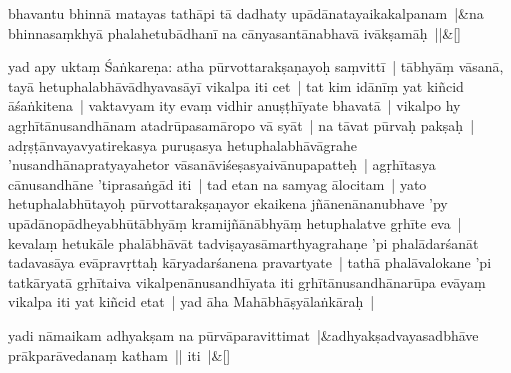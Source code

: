 \documentclass[article,12pt,a4paper]{memoir}%
\newcommand{\persName}[1]{#1}
\newcounter{parCount}
\begin{document}
	{}
	\pend%
      
	    
	    \stanza[\smallbreak]
	  bhavantu bhinnā matayas tathāpi tā dadhaty upādānatayaikakalpanam |&na bhinnasaṃkhyā phalahetubādhanī na cānyasantānabhavā ivākṣamāḥ ||\&[\smallbreak]
	  
	  
	  

	  
	  \pstart \leavevmode%
	\label{thakur75-126.29}yad apy uktaṃ \persName{Śaṅkareṇa}: atha pūrvottarakṣaṇayoḥ saṃvittī | tābhyāṃ vāsanā, tayā hetuphalabhāvādhyavasāyī vikalpa iti cet | \label{thakur75-126.30} tat kim idānīṃ yat kiñcid āśaṅkitena | vaktavyam ity evaṃ vidhir anuṣṭhīyate bhavatā | vikalpo hy agṛhītānusandhānam atadrūpasamāropo vā syāt | \label{thakur75-126.32} na tāvat pūrvaḥ pakṣaḥ | adṛṣṭānvayavyatirekasya puruṣasya hetuphalabhāvāgrahe 'nusandhānapratyayahetor vāsanāviśeṣasyaivānupapatteḥ | agṛhītasya cānusandhāne 'tiprasaṅgād iti | \label{thakur75-127.1} tad etan na samyag ālocitam | yato hetuphalabhūtayoḥ pūrvottarakṣaṇayor ekaikena jñānenānanubhave 'py upādānopādheyabhūtābhyāṃ kramijñānābhyāṃ hetuphalatve gṛhīte eva | kevalaṃ hetukāle phalābhāvāt tadviṣayasāmarthyagrahaṇe 'pi phalādarśanāt tadavasāya evāpravṛttaḥ kāryadarśanena pravartyate | tathā phalāvalokane 'pi tatkāryatā gṛhītaiva vikalpenānusandhīyata iti gṛhītānusandhānarūpa evāyaṃ vikalpa iti yat kiñcid etat | \label{thakur75-127.7} yad āha Mahābhāṣyālaṅkāraḥ |
	{}
	\pend%
      
	    
	    \stanza[\smallbreak]
	  \label{ratnakīrtinibandhāvali__lg__yadi_nāmaikam2}yadi nāmaikam adhyakṣam na pūrvāparavittimat |&adhyakṣadvayasadbhāve prākparāvedanaṃ katham || iti |\&[\smallbreak]
	  
	  
	  
\end{document}
